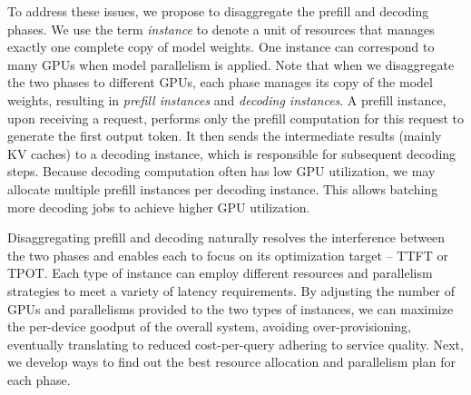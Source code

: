  To address these issues, we propose to disaggregate the prefill and decoding phases. We use the term \textit{instance} to denote a unit of resources that manages exactly one complete copy of model weights. One instance can correspond to many GPUs when model parallelism is applied.
Note that when we disaggregate the two phases to different GPUs, each phase manages its copy of the model weights, resulting in \emph{prefill instances} and \emph{decoding instances}. A prefill instance, upon receiving a request, performs only the prefill computation for this request to generate the first output token. It then sends the intermediate results (mainly KV caches) to a decoding instance, which is responsible for subsequent decoding steps. 
Because decoding computation often has low GPU utilization, we may allocate multiple prefill instances per decoding instance. This allows batching more decoding jobs to achieve higher GPU utilization.

Disaggregating prefill and decoding naturally resolves the interference between the two phases and enables each to focus on its optimization target -- TTFT or TPOT. Each type of instance can employ different resources and parallelism strategies to meet a variety of latency requirements. 
By adjusting the number of GPUs and parallelisms provided to the two types of instances, we can maximize the per-device goodput of the overall system, avoiding over-provisioning, eventually translating to reduced cost-per-query adhering to service quality. Next, we develop ways to find out the best resource allocation and parallelism plan for each phase.